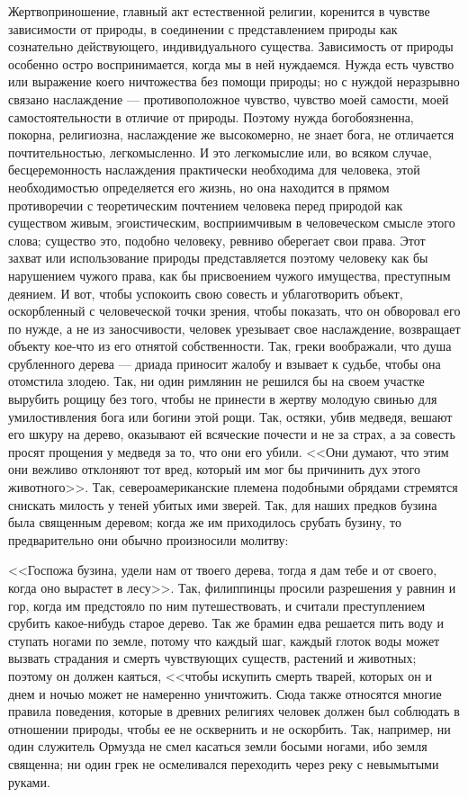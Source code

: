 \documentclass[12pt]{article}
\begin{document}
Жертвоприношение, главный акт естественной религии, коренится в чувстве зависимости от природы, в соединении с представлением природы как сознательно действующего, индивидуального существа. Зависимость от природы особенно остро воспринимается, когда мы в ней нуждаемся. Нужда есть чувство или выражение коего ничтожества без помощи природы; но с нуждой неразрывно связано наслаждение --- противоположное чувство, чувство моей самости, моей самостоятельности в отличие от природы. Поэтому нужда богобоязненна, покорна, религиозна, наслаждение же высокомерно, не знает бога, не отличается почтительностью, легкомысленно. И это легкомыслие или, во всяком случае, бесцеремонность наслаждения практически необходима для человека, этой необходимостью определяется его жизнь, но она находится в прямом противоречии с теоретическим почтением человека перед природой как существом живым, эгоистическим, восприимчивым в человеческом смысле этого слова; существо это, подобно человеку, ревниво оберегает свои права. Этот захват или использование природы представляется поэтому человеку как бы нарушением чужого права, как бы присвоением чужого имущества, преступным деянием. И вот, чтобы успокоить свою совесть и ублаготворить объект, оскорбленный с человеческой точки зрения, чтобы показать, что он обворовал его по нужде, а не из заносчивости, человек урезывает свое наслаждение, возвращает объекту кое-что из его отнятой собственности. Так, греки воображали, что душа срубленного дерева --- дриада приносит жалобу и взывает к судьбе, чтобы она отомстила злодею. Так, ни один римлянин не решился бы на своем участке вырубить рощицу без того, чтобы не принести в жертву молодую свинью для умилостивления бога или богини этой рощи. Так, остяки, убив медведя, вешают его шкуру на дерево, оказывают ей всяческие почести и не за страх, а за совесть просят прощения у медведя за то, что они его убили. <<Они думают, что этим они вежливо отклоняют тот вред, который им мог бы причинить дух этого животного>>. Так, североамериканские племена подобными обрядами стремятся снискать милость у теней убитых ими зверей. Так, для наших предков бузина была священным деревом; когда же им приходилось срубать бузину, то предварительно они обычно произносили молитву:

<<Госпожа бузина, удели нам от твоего дерева, тогда я дам тебе и от своего, когда оно вырастет в лесу>>. Так, филиппинцы просили разрешения у равнин и гор, когда им предстояло по ним путешествовать, и считали преступлением срубить какое-нибудь старое дерево. Так же брамин едва решается пить воду и ступать ногами по земле, потому что каждый шаг, каждый глоток воды может вызвать страдания и смерть чувствующих существ, растений и животных; поэтому он должен каяться, <<чтобы искупить смерть тварей, которых он и днем и ночью может не намеренно уничтожить. Сюда также относятся многие правила поведения, которые в древних религиях человек должен был соблюдать в отношении природы, чтобы ее не осквернить и не оскорбить. Так, например, ни один служитель Ормузда не смел касаться земли босыми ногами, ибо земля священна; ни один грек не осмеливался переходить через реку с невымытыми руками.
\end{document}
